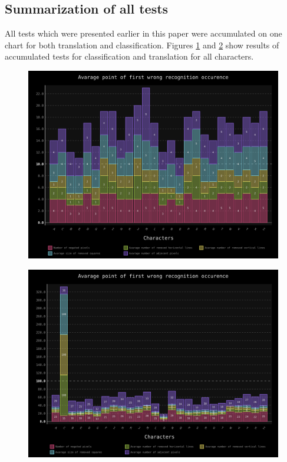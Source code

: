 \documentclass[a4paper]{article}
\begin{document}
\clearpage
\subsection{Summarization of all tests}
All tests which were presented earlier in this paper were accumulated on one chart for both translation and classification.
Figures \ref{all_trans} and \ref{all_clas} show results of accumulated tests for classification and translation for all characters.
\begin{figure}[ht]
	\centering
	\includegraphics[scale=0.7,keepaspectratio=true]{Charts/AllTestPlanResultsChart_NormalTester.png}	
	\caption{}
	\label{all_trans}
\end{figure}

\begin{figure}[t]
	\centering
	\includegraphics[scale=0.7,keepaspectratio=true]{Charts/AllTestPlanResultsChart_ClasifierTester.png}	
	\caption{}
	\label{all_clas}
\end{figure}
\clearpage
\pagebreak
\pagebreak
\end{document}

